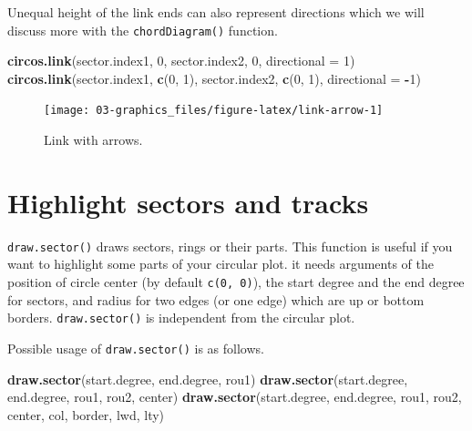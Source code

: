 \documentclass[]{book}
\newenvironment{Shaded}{\begin{snugshade}}{\end{snugshade}}
\newcommand{\KeywordTok}[1]{\textcolor[rgb]{0.13,0.29,0.53}{\textbf{#1}}}
\newcommand{\DataTypeTok}[1]{\textcolor[rgb]{0.13,0.29,0.53}{#1}}
\newcommand{\DecValTok}[1]{\textcolor[rgb]{0.00,0.00,0.81}{#1}}
\newcommand{\OperatorTok}[1]{\textcolor[rgb]{0.81,0.36,0.00}{\textbf{#1}}}
\newcommand{\NormalTok}[1]{#1}
\theoremstyle{definition}
\theoremstyle{definition}
\theoremstyle{remark}
\begin{document}
Unequal height of the link ends can also represent directions which we
will discuss more with the \texttt{chordDiagram()} function.

\begin{Shaded}
\begin{Highlighting}[]
\KeywordTok{circos.link}\NormalTok{(sector.index1, }\DecValTok{0}\NormalTok{, sector.index2, }\DecValTok{0}\NormalTok{, }\DataTypeTok{directional =} \DecValTok{1}\NormalTok{)}
\KeywordTok{circos.link}\NormalTok{(sector.index1, }\KeywordTok{c}\NormalTok{(}\DecValTok{0}\NormalTok{, }\DecValTok{1}\NormalTok{), sector.index2, }\KeywordTok{c}\NormalTok{(}\DecValTok{0}\NormalTok{, }\DecValTok{1}\NormalTok{), }\DataTypeTok{directional =} \OperatorTok{-}\DecValTok{1}\NormalTok{)}
\end{Highlighting}
\end{Shaded}

\begin{figure}

{\centering \texttt{[image: 03-graphics\_files/figure-latex/link-arrow-1]} 

}

\caption{Link with arrows.}\label{fig:link-arrow}
\end{figure}

\section{Highlight sectors and
tracks}\label{highlight-sectors-and-tracks}

\texttt{draw.sector()} draws sectors, rings or their parts. This
function is useful if you want to highlight some parts of your circular
plot. it needs arguments of the position of circle center (by default
\texttt{c(0,\ 0)}), the start degree and the end degree for sectors, and
radius for two edges (or one edge) which are up or bottom borders.
\texttt{draw.sector()} is independent from the circular plot.

Possible usage of \texttt{draw.sector()} is as follows.

\begin{Shaded}
\begin{Highlighting}[]
\KeywordTok{draw.sector}\NormalTok{(start.degree, end.degree, rou1)}
\KeywordTok{draw.sector}\NormalTok{(start.degree, end.degree, rou1, rou2, center)}
\KeywordTok{draw.sector}\NormalTok{(start.degree, end.degree, rou1, rou2, center, col, border, lwd, lty)}
\end{Highlighting}
\end{Shaded}
\end{document}
